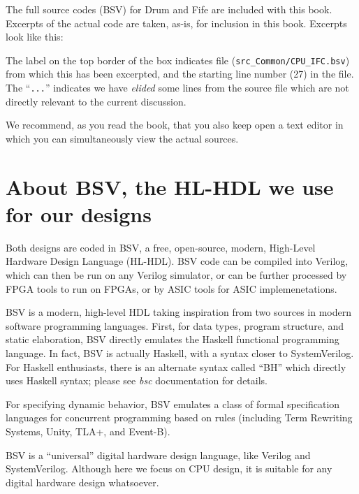 The full source codes (BSV) for Drum and Fife are included with this
book.  Excerpts of the actual code are taken, as-is, for inclusion in
this book.  Excerpts look like this:



The label on the top border of the box indicates file
(\verb|src_Common/CPU_IFC.bsv|) from which this has been excerpted,
and the starting line number (27) in the file.  The ``\verb|...|''
indicates we have \emph{elided} some lines from the source file which
are not directly relevant to the current discussion.

We recommend, as you read the book, that you also keep open a text
editor in which you can simultaneously view the actual sources.


\section{About BSV, the HL-HDL we use for our designs}

Both designs are coded in BSV, a free, open-source, modern, High-Level
Hardware Design Language (HL-HDL).  BSV code can be compiled into
Verilog, which can then be run on any Verilog simulator, or can be
further processed by FPGA tools to run on FPGAs, or by ASIC tools for
ASIC implemenetations.


BSV is a modern, high-level HDL taking inspiration from two sources in
modern software programming languages.  First, for data types, program
structure, and static elaboration, BSV directly emulates the Haskell
functional programming language.  In fact, BSV is actually Haskell,
with a syntax closer to SystemVerilog.  For Haskell enthusiasts, there
is an alternate syntax called ``BH'' which directly uses Haskell
syntax; please see \emph{bsc} documentation for details.

For specifying dynamic behavior, BSV emulates a class of formal
specification languages for concurrent programming based on rules
(including Term Rewriting Systems, Unity, TLA+, and Event-B).

BSV is a ``universal'' digital hardware design language, like Verilog
and SystemVerilog.  Although here we focus on CPU design, it is
suitable for any digital hardware design whatsoever.

